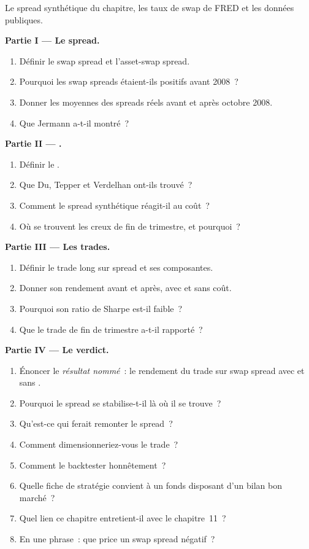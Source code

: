 \begin{problem}\label{pb:s2:swap-spread-and-asset-swap-trades:1}
Le spread synthétique du chapitre, les taux de swap de FRED et les données publiques.

\medskip\noindent\textbf{Partie I --- Le spread.}
\begin{enumerate}
\item Définir le swap spread et l'asset-swap spread.
\item Pourquoi les swap spreads étaient-ils positifs avant 2008~?
\item Donner les moyennes des spreads réels avant et après octobre 2008.
\item Que Jermann a-t-il montré~?
\end{enumerate}

\medskip\noindent\textbf{Partie II --- .}
\begin{enumerate}[resume]
\item Définir le .
\item Que Du, Tepper et Verdelhan ont-ils trouvé~?
\item Comment le spread synthétique réagit-il au coût~?
\item Où se trouvent les creux de fin de trimestre, et pourquoi~?
\end{enumerate}

\medskip\noindent\textbf{Partie III --- Les trades.}
\begin{enumerate}[resume]
\item Définir le trade long sur spread et ses composantes.
\item Donner son rendement avant et après, avec et sans coût.
\item Pourquoi son ratio de Sharpe est-il faible~?
\item Que le trade de fin de trimestre a-t-il rapporté~?
\end{enumerate}

\medskip\noindent\textbf{Partie IV --- Le verdict.}
\begin{enumerate}[resume]
\item Énoncer le \emph{résultat nommé}~: le rendement du trade sur swap spread avec et sans .
\item Pourquoi le spread se stabilise-t-il là où il se trouve~?
\item Qu'est-ce qui ferait remonter le spread~?
\item Comment dimensionneriez-vous le trade~?
\item Comment le backtester honnêtement~?
\item Quelle fiche de stratégie convient à un fonds disposant d'un bilan bon marché~?
\item Quel lien ce chapitre entretient-il avec le chapitre~11~?
\item En une phrase~: que price un swap spread négatif~?
\end{enumerate}
\end{problem}

